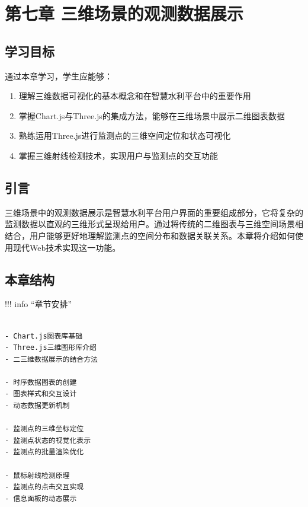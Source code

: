 \section{第七章 三维场景的观测数据展示}\label{ux7b2cux4e03ux7ae0-ux4e09ux7ef4ux573aux666fux7684ux89c2ux6d4bux6570ux636eux5c55ux793a}

\subsection{学习目标}\label{ux5b66ux4e60ux76eeux6807}

通过本章学习，学生应能够：

\begin{enumerate}
\def\labelenumi{\arabic{enumi}.}
\tightlist
\item
  理解三维数据可视化的基本概念和在智慧水利平台中的重要作用
\item
  掌握Chart.js与Three.js的集成方法，能够在三维场景中展示二维图表数据
\item
  熟练运用Three.js进行监测点的三维空间定位和状态可视化
\item
  掌握三维射线检测技术，实现用户与监测点的交互功能
\end{enumerate}

\subsection{引言}\label{ux5f15ux8a00}

三维场景中的观测数据展示是智慧水利平台用户界面的重要组成部分，它将复杂的监测数据以直观的三维形式呈现给用户。通过将传统的二维图表与三维空间场景相结合，用户能够更好地理解监测点的空间分布和数据关联关系。本章将介绍如何使用现代Web技术实现这一功能。

\subsection{本章结构}\label{ux672cux7ae0ux7ed3ux6784}

!!! info ``章节安排''

\begin{verbatim}

- Chart.js图表库基础
- Three.js三维图形库介绍
- 二三维数据展示的结合方法

- 时序数据图表的创建
- 图表样式和交互设计
- 动态数据更新机制

- 监测点的三维坐标定位
- 监测点状态的视觉化表示
- 监测点的批量渲染优化

- 鼠标射线检测原理
- 监测点的点击交互实现
- 信息面板的动态展示
\end{verbatim}


